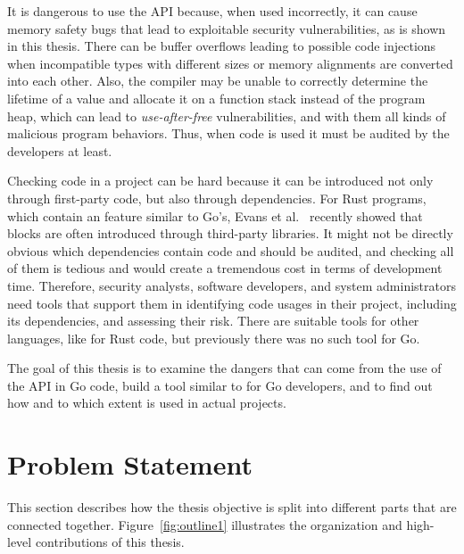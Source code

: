 It is dangerous to use the \unsafe{} \acrshort{API} because, when used incorrectly, it can cause memory safety bugs that
lead to exploitable security vulnerabilities, as is shown in this thesis.
There can be buffer overflows leading to possible code injections when incompatible types with different sizes or
memory alignments are converted into each other.
Also, the compiler may be unable to correctly determine the lifetime of a value and allocate it on a function stack
instead of the program heap, which can lead to \textit{use-after-free} vulnerabilities, and with them all kinds of
malicious program behaviors.
Thus, when \unsafe{} code is used it must be audited by the developers at least.

Checking \unsafe{} code in a project can be hard because it can be introduced not only through first-party code, but
also through dependencies.
For Rust programs, which contain an \unsafe{} feature similar to Go's, Evans et al.~\cite{evans2020} recently showed
that \unsafe{} blocks are often introduced through third-party libraries.
It might not be directly obvious which dependencies contain \unsafe{} code and should be audited, and checking all of
them is tedious and would create a tremendous cost in terms of development time.
Therefore, security analysts, software developers, and system administrators need tools that support them in identifying
\unsafe{} code usages in their project, including its dependencies, and assessing their risk.
There are suitable tools for other languages, like \toolCargoGeiger{} for Rust code, but previously there was no such
tool for Go.

The goal of this thesis is to examine the dangers that can come from the use of the \unsafe{} \acrshort{API} in Go code,
build a tool similar to \toolCargoGeiger{} for Go developers, and to find out how and to which extent \unsafe{} is used
in actual projects.



\section{Problem Statement}\label{sec:introduction:problem-statement}

This section describes how the thesis objective is split into different parts that are connected together.
Figure~\ref{fig:outline1} illustrates the organization and high-level contributions of this thesis.

